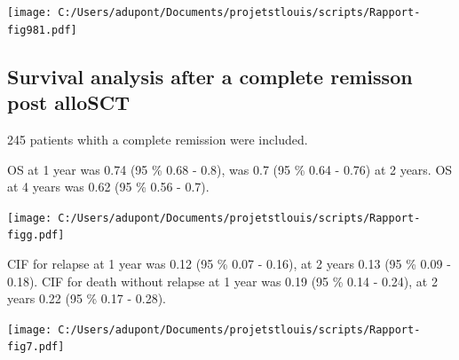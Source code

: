 \documentclass[a4paper,11pt] {article}
\begin{document}
\begin{center}
\texttt{[image: C:/Users/adupont/Documents/projetstlouis/scripts/Rapport-fig981.pdf]}

\end{center}





\pagebreak
\subsection{Survival analysis after a complete remisson post alloSCT}
245 patients whith a complete remission were included.


OS at 1 year was 0.74 (95 \% 0.68 - 0.8), was 0.7 (95 \% 0.64 - 0.76) at 2 years. OS at 4 years was 0.62 (95 \% 0.56 - 0.7).
\\
\begin{center}
\texttt{[image: C:/Users/adupont/Documents/projetstlouis/scripts/Rapport-figg.pdf]}

\pagebreak
CIF for relapse at 1 year was 0.12 (95 \% 0.07 - 0.16), at 2 years  0.13 (95 \% 0.09 - 0.18). CIF for death without relapse  at 1 year was 0.19 (95 \% 0.14 - 0.24), at 2 years  0.22 (95 \% 0.17 - 0.28). 


\begin{center}
\texttt{[image: C:/Users/adupont/Documents/projetstlouis/scripts/Rapport-fig7.pdf]}

\end{center}




\end{center}
\end{document}
